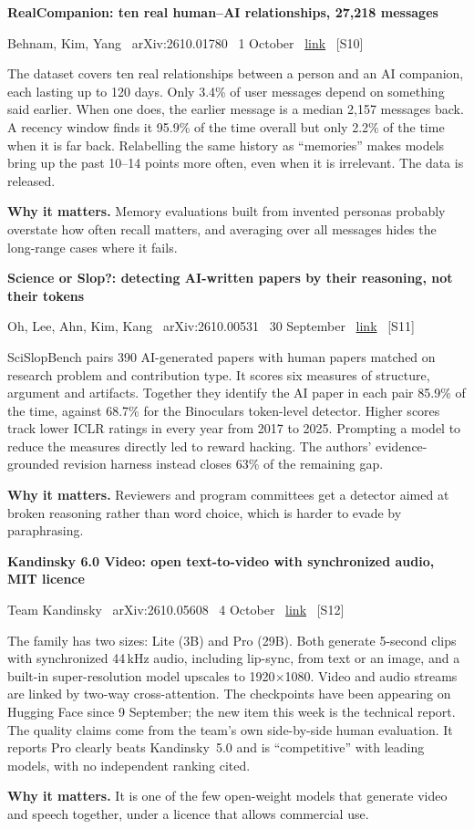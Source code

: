 \documentclass[11pt,a4paper]{article}
\newcommand{\entry}[4]{%
  \par\vspace{0.7em}%
  {\sffamily\bfseries\color{brandink}#1}\par
  {\footnotesize\color{brandgrey}#2 \textbullet\ \href{#3}{link} \textbullet\ \srcref{#4}}\par
  \vspace{0.15em}}
\newcommand{\why}[1]{\par{\small\textbf{Why it matters.} #1}\par}
\newcommand{\srcref}[1]{\textcolor{brandaccent}{[S#1]}}
\begin{document}
\entry{RealCompanion: ten real human--AI relationships, 27,218 messages}{Behnam, Kim, Yang \textbullet\ arXiv:2610.01780 \textbullet\ 1 October}{https://arxiv.org/abs/2610.01780}{10}
The dataset covers ten real relationships between a person and an AI companion, each lasting
up to 120 days. Only 3.4\% of user messages depend on something said earlier. When one does,
the earlier message is a median 2,157 messages back. A recency window finds it 95.9\% of the
time overall but only 2.2\% of the time when it is far back. Relabelling the same history as
``memories'' makes models bring up the past 10--14 points more often, even when it is
irrelevant. The data is released.
\why{Memory evaluations built from invented personas probably overstate how often recall matters, and averaging over all messages hides the long-range cases where it fails.}

\entry{Science or Slop?: detecting AI-written papers by their reasoning, not their tokens}{Oh, Lee, Ahn, Kim, Kang \textbullet\ arXiv:2610.00531 \textbullet\ 30 September}{https://arxiv.org/abs/2610.00531}{11}
SciSlopBench pairs 390 AI-generated papers with human papers matched on research problem and
contribution type. It scores six measures of structure, argument and artifacts. Together they
identify the AI paper in each pair 85.9\% of the time, against 68.7\% for the Binoculars
token-level detector. Higher scores track lower ICLR ratings in every year from 2017 to 2025.
Prompting a model to reduce the measures directly led to reward hacking. The authors'
evidence-grounded revision harness instead closes 63\% of the remaining gap.
\why{Reviewers and program committees get a detector aimed at broken reasoning rather than word choice, which is harder to evade by paraphrasing.}

\entry{Kandinsky 6.0 Video: open text-to-video with synchronized audio, MIT licence}{Team Kandinsky \textbullet\ arXiv:2610.05608 \textbullet\ 4 October}{https://arxiv.org/abs/2610.05608}{12}
The family has two sizes: Lite (3B) and Pro (29B). Both generate 5-second clips with
synchronized 44\,kHz audio, including lip-sync, from text or an image, and a built-in
super-resolution model upscales to 1920$\times$1080. Video and audio streams are linked by
two-way cross-attention. The checkpoints have been appearing on Hugging Face since
9 September; the new item this week is the technical report. The quality claims come from
the team's own side-by-side human evaluation. It reports Pro clearly beats Kandinsky~5.0 and
is ``competitive'' with leading models, with no independent ranking cited.
\why{It is one of the few open-weight models that generate video and speech together, under a licence that allows commercial use.}
\end{document}

